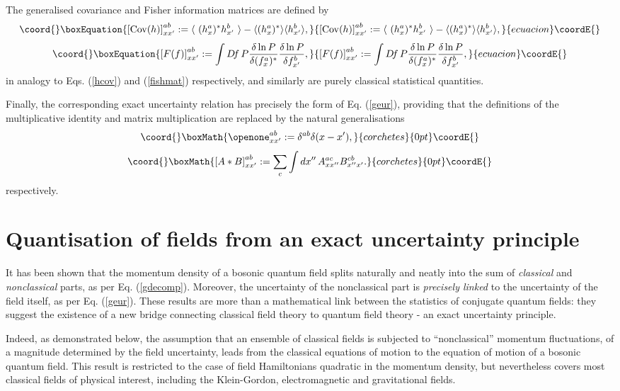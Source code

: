 \documentclass[a4paper,preprint, showpacs, aps, draft]{revtex4}
\begin{document}
{The generalised covariance and Fisher information matrices are defined
by 
\begin{equation}\coord{}\boxEquation{
\left[{\rm Cov}(h)\right]^{ab}_{xx'} := \langle~(h^a_x)^*h^b_{x'}~\rangle
- \langle(h^a_x)^*\rangle \langle h^b_{x'}\rangle ,
}{
\left[{\rm Cov}(h)\right]^{ab}_{xx'} := \langle~(h^a_x)^*h^b_{x'}~\rangle
- \langle(h^a_x)^*\rangle \langle h^b_{x'}\rangle ,
}{ecuacion}\coordE{}\end{equation}
\begin{equation}\coord{}\boxEquation{
\left[ F(f)\right]^{ab}_{xx'} :=
\int D\! f\, P\frac{\delta\ln P}{\delta(f^a_x)^*}
\frac{\delta\ln P}{\delta f^b_{x'}} , 
}{
\left[ F(f)\right]^{ab}_{xx'} :=
\int D\! f\, P\frac{\delta\ln P}{\delta(f^a_x)^*}
\frac{\delta\ln P}{\delta f^b_{x'}} , 
}{ecuacion}\coordE{}\end{equation}
in analogy to Eqs. (\ref{hcov}) and (\ref{fishmat}) respectively, and
similarly are purely classical statistical quantities.

Finally, the corresponding exact uncertainty relation has precisely the
form of Eq. (\ref{geur}), providing that the definitions of the 
multiplicative identity and matrix multiplication are replaced by the
natural generalisations 
\[\coord{}\boxMath{
\openone^{ab}_{xx'} := \delta^{ab}\delta(x-x') ,}{corchetes}{0pt}\coordE{}\]
\[\coord{}\boxMath{
\left[ A\ast B\right]^{ab}_{xx'} := \sum_c\int dx''\, A^{ac}_{xx''}
B^{cb}_{x''x'} .}{corchetes}{0pt}\coordE{}\]
respectively.

\section{Quantisation of fields from an exact uncertainty principle}

It has been shown that the momentum density of a
bosonic quantum field splits naturally and neatly into the sum of {\it
classical} and {\it nonclassical} parts, as per Eq. (\ref{gdecomp}).
Moreover, the uncertainty of the nonclassical part is {\it precisely
linked} to the uncertainty of the field itself, as per Eq. (\ref{geur}).
These results are more than a mathematical link between the
statistics of conjugate quantum fields:  they suggest the existence of a
new bridge connecting classical field theory to quantum field theory - an
exact uncertainty principle.

Indeed, as demonstrated below, the assumption that an ensemble
of classical fields is subjected to ``nonclassical'' momentum
fluctuations, of a magnitude determined by the field uncertainty, leads
from the classical equations of motion to the equation of motion  of a
bosonic quantum field.  This result is restricted to the case of
field Hamiltonians quadratic in the momentum density, but nevertheless 
covers most classical fields of physical interest, including the
Klein-Gordon, electromagnetic and gravitational fields.

}
\end{document}
